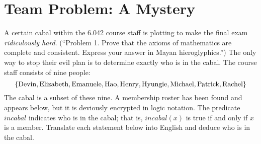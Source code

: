 \documentclass[12pt]{article}
\newcommand{\C}{\textit{incabal}}
\begin{document}
\break
\section{Team Problem:  A Mystery}

A certain cabal within the 6.042 course staff is plotting to make the
final exam \textit{ridiculously hard}.  (``Problem 1.  Prove that the
axioms of mathematics are complete and consistent.  Express your
answer in Mayan hieroglyphics.'')  The only way to stop their evil plan
is to determine exactly who is in the cabal.  The course staff
consists of nine people:
%
\[
\left\{\text{Devin}, \text{Elizabeth}, \text{Emanuele}, \text{Hao}, \text{Henry}, \text{Hyungie}, \text{Michael}, \text{Patrick}, \text{Rachel}\right\}
\]
%
The cabal is a subset of these nine.  A membership roster has been
found and appears below, but it is deviously encrypted in logic
notation.  The predicate $\C$ indicates who is in the cabal; that is,
$\C(x)$ is true if and only if $x$ is a member.  Translate each
statement below into English and deduce who is in the cabal.
\end{document}
